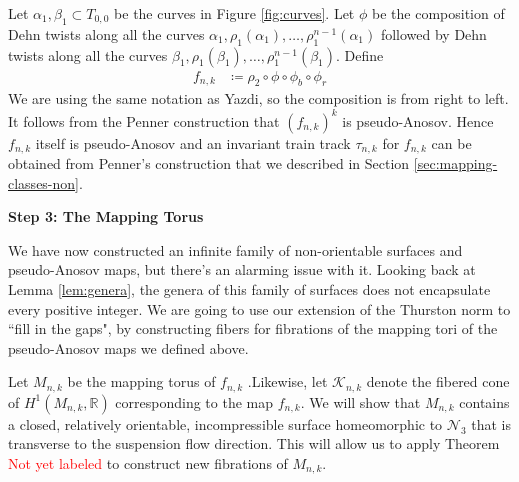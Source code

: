 Let $\alpha_1,\beta_1 \subset T_{0,0}$ be the curves in Figure \ref{fig:curves}. Let $\phi$ be the composition of Dehn twists along all the curves $\alpha_1, \rho_1(\alpha_1), \dots, \rho_1^{n-1}(\alpha_1)$ followed by Dehn twists along all the curves $\beta_1,\rho_1(\beta_1),\dots,\rho_1^{n-1}(\beta_1)$. Define
\begin{align*}
    f_{n,k} &\coloneqq \rho_2 \circ \phi \circ \phi_b \circ \phi_r
\end{align*}
We are using the same notation as Yazdi, so the composition is from right to left. It follows from the Penner construction that $(f_{n,k})^k$ is pseudo-Anosov. Hence $f_{n,k}$ itself is pseudo-Anosov and an invariant train track $\tau_{n,k}$ for $f_{n,k}$ can be obtained from Penner's construction that we described in Section \ref{sec:mapping-classes-non}.

\begin{center}
\textbf{Step 3: The Mapping Torus}
\end{center}

We have now constructed an infinite family of non-orientable surfaces and pseudo-Anosov maps, but there's an alarming issue with it. Looking back at Lemma \ref{lem:genera}, the genera of this family of surfaces does not encapsulate every positive integer. We are going to use our extension of the Thurston norm to ``fill in the gaps", by constructing fibers for fibrations of the mapping tori of the pseudo-Anosov maps we defined above.

Let $M_{n,k}$ be the mapping torus of $f_{n,k}$ .Likewise, let $\mathcal{K}_{n,k}$ denote the fibered cone of $H^1(M_{n,k},\mathbb{R})$ corresponding to the map $f_{n,k}$. We will show that $M_{n,k}$ contains a closed, relatively orientable, incompressible surface homeomorphic to $\mathcal{N}_3$ that is transverse to the suspension flow direction. This will allow us to apply Theorem \textcolor{red}{Not yet labeled} to construct new fibrations of $M_{n,k}$.

